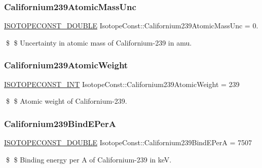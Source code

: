 \subsubsection{\texorpdfstring{Californium239\+Atomic\+Mass\+Unc}{Californium239AtomicMassUnc}}
{\footnotesize\ttfamily \mbox{\hyperlink{group___isotope_const-_macros_ga8f45a7272ce02c0b4c65c44636ed719a}{I\+S\+O\+T\+O\+P\+E\+C\+O\+N\+S\+T\+\_\+\+D\+O\+U\+B\+LE}} Isotope\+Const\+::\+Californium239\+Atomic\+Mass\+Unc = 0.}

\$ \$ Uncertainty in atomic mass of Californium-\/239 in amu. \mbox{\label{group___isotope_const-_californium-_cf239_gac0a39e7db92bb8db2deeab00dfe89bd0}} 
\subsubsection{\texorpdfstring{Californium239\+Atomic\+Weight}{Californium239AtomicWeight}}
{\footnotesize\ttfamily \mbox{\hyperlink{group___isotope_const-_macros_ga5f18360b3e99483a35c32d789e62621c}{I\+S\+O\+T\+O\+P\+E\+C\+O\+N\+S\+T\+\_\+\+I\+NT}} Isotope\+Const\+::\+Californium239\+Atomic\+Weight = 239}

\$ \$ Atomic weight of Californium-\/239. \mbox{\label{group___isotope_const-_californium-_cf239_gad254af68a318be4d65067f7e43bc9b1d}} 
\subsubsection{\texorpdfstring{Californium239\+Bind\+E\+PerA}{Californium239BindEPerA}}
{\footnotesize\ttfamily \mbox{\hyperlink{group___isotope_const-_macros_ga8f45a7272ce02c0b4c65c44636ed719a}{I\+S\+O\+T\+O\+P\+E\+C\+O\+N\+S\+T\+\_\+\+D\+O\+U\+B\+LE}} Isotope\+Const\+::\+Californium239\+Bind\+E\+PerA = 7507}

\$ \$ Binding energy per A of Californium-\/239 in keV. \mbox{\label{group___isotope_const-_californium-_cf239_gaa860a6fc62d1d414cde4de552ecbc906}} 
